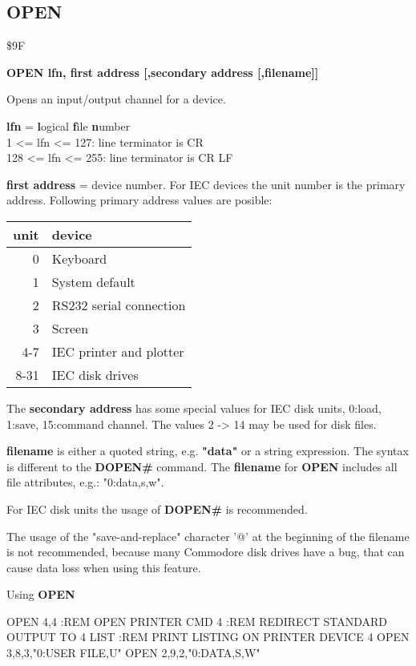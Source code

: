 
\newpage
\subsection{OPEN}
\begin{description}[leftmargin=3cm,style=nextline]
\item [Token:] \$9F
\item [Format:]
  {\bf OPEN lfn, first address [,secondary address [,filename]]}
\item [Usage:]
   Opens an input/output channel for
   a device.

   {\bf lfn} = {\bf l}ogical {\bf f}ile {\bf n}umber \\
   1 <= lfn <= 127: line terminator is CR \\
   128 <= lfn <= 255: line terminator is CR LF

   {\bf first address} = device number.
   For IEC devices the unit number is the primary address.
   Following primary address values are posible:

\ttfamily
{\setlength{\tabcolsep}{1mm}
\begin{tabular}{|r|l|}
\hline
  unit  & device \\
\hline
  0 & Keyboard \\
  1 & System default \\
  2 & RS232 serial connection \\
  3 & Screen \\
  4-7 & IEC printer and plotter \\
  8-31 & IEC disk drives \\
\hline
\end{tabular}
}

   The {\bf secondary address} has some special values for
   IEC disk units, 0:load, 1:save, 15:command channel.
   The values 2 -> 14 may be used for disk files.

   {\bf filename} is either a quoted string, e.g. {\bf "data"} or
   a string expression. The syntax is different to the {\bf DOPEN\#}
   command. The {\bf filename} for {\bf OPEN} includes all
   file attributes, e.g.: "0:data,s,w".

\item [Remarks:]
   For IEC disk units the usage of {\bf DOPEN#} is recommended.

   The usage of the "save-and-replace" character '@' at the
   beginning of the filename is not recommended, because many
   Commodore disk drives have a bug, that can cause data loss
   when using this feature.

\item [Example:] Using {\bf OPEN}

\begin{screenoutput}
   OPEN 4,4   :REM OPEN PRINTER
   CMD 4      :REM REDIRECT STANDARD OUTPUT TO 4
   LIST       :REM PRINT LISTING ON PRINTER DEVICE 4
   OPEN 3,8,3,"0:USER FILE,U"
   OPEN 2,9,2,"0:DATA,S,W"
\end{screenoutput}
\end{description}

